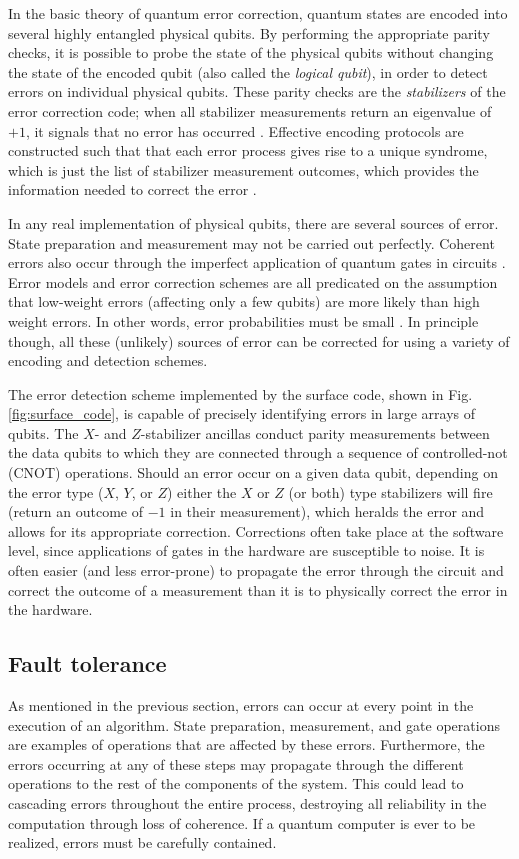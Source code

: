 In the basic theory of quantum error correction, quantum states are encoded into
several highly entangled physical qubits. By performing the appropriate parity
checks, it is possible to probe the state of the physical qubits without
changing the state of the encoded qubit (also called the \textit{logical
  qubit}), in order to detect errors on individual physical qubits. These parity
checks are the \textit{stabilizers} of the error correction code; when all
stabilizer measurements return an eigenvalue of $+1$, it signals that no error
has occurred \cite{nielsen_chuang_2010}. Effective encoding protocols are
constructed such that that each error process gives rise to a unique syndrome,
which is just the list of stabilizer measurement outcomes, which provides the
information needed to correct the error \cite{fowler12_surfac_codes}.

In any real implementation of physical qubits, there are several sources of
error. State preparation and measurement may not be carried out perfectly.
Coherent errors also occur through the imperfect application of quantum gates in
circuits \cite{Devitt_2013}. Error models and error correction schemes are all
predicated on the assumption that low-weight errors (affecting only a few
qubits) are more likely than high weight errors. In other words, error
probabilities must be small \cite{terhal15}. In principle though, all these
(unlikely) sources of error can be corrected for using a variety of encoding and
detection schemes.

The error detection scheme implemented by the surface code, shown in Fig.
\ref{fig:surface_code}, is capable of precisely identifying errors in large
arrays of qubits. The $X$- and $Z$-stabilizer ancillas conduct parity
measurements between the data qubits to which they are connected through a
sequence of controlled-not (CNOT) operations. Should an error occur on a given
data qubit, depending on the error type ($X$, $Y$, or $Z$) either the $X$ or $Z$
(or both) type stabilizers will fire (return an outcome of $-1$ in their
measurement), which heralds the error and allows for its appropriate correction.
Corrections often take place at the software level, since applications of gates
in the hardware are susceptible to noise. It is often easier (and less
error-prone) to propagate the error through the circuit and correct the outcome
of a measurement than it is to physically correct the error in the hardware.

\subsection{Fault tolerance}
As mentioned in the previous section, errors can occur at every point in the
execution of an algorithm. State preparation, measurement, and gate operations
are examples of operations that are affected by these errors. Furthermore, the
errors occurring at any of these steps may propagate through the different
operations to the rest of the components of the system. This could lead to
cascading errors throughout the entire process, destroying all reliability in
the computation through loss of coherence. If a quantum computer is ever to be
realized, errors must be carefully contained.

